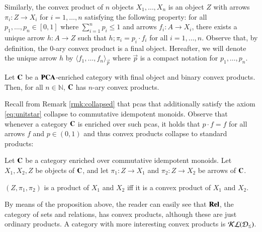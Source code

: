 Similarly, the convex product of $n$ objects $X_1,\ldots,X_n$ is an object $Z$ with arrows $\pi_i\colon Z\to X_i$ for $i=1,\ldots,n$ satisfying the following property: for all $p_1, \dots, p_n \in [0,1]$ where $\sum_{i=1}^n p_i \le 1$ and arrows $f_i\colon A\to X_i$, there exists a unique arrow $h\colon A \to Z$ such that $h;\pi_i = p_i\cdot f_i$ for all $i=1,\ldots,n$. Observe that, by definition, the 0-ary convex product is a final object. Hereafter, we will denote the unique arrow $h$ by $\langle f_1, \dots, f_n \rangle_{\vec{p}}$ where $\vec{p}$ is a compact notation for $p_1, \dots , p_n$.

\begin{lemma}\label{lemma:naryconvexproduct}
Let $\mathbf{C}$ be a $\mathbf{PCA}$-enriched category with final object and binary convex products. Then, for all $n\in \mathbb{N}$, $\mathbf{C}$ has $n$-ary convex products.
\end{lemma}
%




Recall from Remark \ref{rmk:collapsed} that pcas that additionally satisfy the axiom \eqref{eq:unitstar} collapse to commutative idempotent monoids.
Observe that whenever a category $\mathbf{C}$ is enriched over such pcas, it holds that $p\cdot f = f$ for all arrows $f$ and $p\in(0,1)$ and thus convex products collapse to standard products:
\begin{proposition}\label{prop:productvsconvex}
Let $\mathbf{C}$ be a category enriched over commutative idempotent monoids. Let $X_1,X_2,Z$ be objects of $\mathbf{C}$, and let $\pi_1\colon Z \to X_1$ and $\pi_2\colon Z \to X_2$ be arrows of $\mathbf{C}$. 
\begin{center}$(Z,\pi_1,\pi_2)$ is a  product  of $X_1$ and $X_2$ iff it is a convex product of $X_1$ and $X_2$.\end{center}
\end{proposition}


By means of the proposition above, the reader can easily see that $\mathbf{Rel}$, the category of sets and relations, has convex products, although these are just ordinary products. A  category with more interesting convex products is $\mathcal{KL}(\mathcal{D}_{\leq})$.

